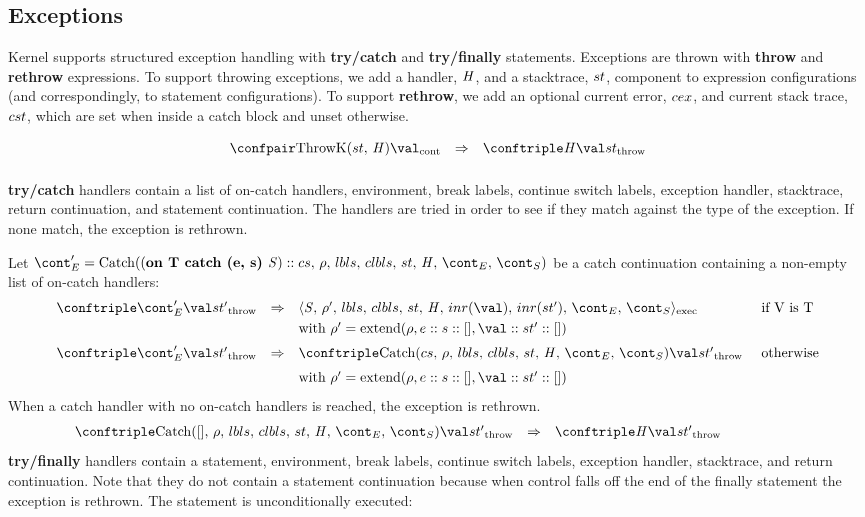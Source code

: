 \documentclass{article}
\DeclareMathOperator{\extend}{extend}
\begin{document}
\subsection{Exceptions}

Kernel supports structured exception handling with \textbf{try/catch} and \textbf{try/finally} statements.
Exceptions are thrown with \textbf{throw} and \textbf{rethrow} expressions.
To support throwing exceptions, we add a handler, $\mathit{H}$, and a stacktrace, $st$, component to expression configurations (and correspondingly, to statement configurations).
To support \textbf{rethrow}, we add an optional current error, $cex$, and current stack trace, $cst$, which are set when inside a catch block and unset otherwise.

\[
  \begin{array}{lcl}
	\contconf{\ThrowH{\strace}{\handler}}{\val}
	& \Rightarrow &
	\throwconf{\handler}{\val}{\strace}\\[2mm]

  \end{array}
\]

\noindent
\textbf{try/catch} handlers contain a list of on-catch handlers, environment, break labels, continue switch labels, exception handler, stacktrace, return continuation, and statement continuation.
The handlers are tried in order to see if they match against the type of the exception.
If none match, the exception is rethrown.

\noindent
Let $\econt' = \CatchH{(\textbf{on T catch (e, s) }\stmt) :: cs}$ be a catch continuation containing a non-empty list of on-catch handlers:
\[
  \begin{array}{lcll}
	\throwconf{\econt'}{\val}{\strace'}
	& \Rightarrow &
	\execconf{\stmt}{\env'}{\lbls}{\clbls}{\handler}{inr(\val)}{inr(\strace')}{\econt}{\scont}
	&\textrm{ if V is T}\\[1mm]

	&&\textrm{with } \env' = \extend(\env, e :: s :: [], \val :: \strace' :: [])\\[2mm]

	\throwconf{\econt'}{\val}{\strace'}
	& \Rightarrow &
	\throwconf{\CatchH{cs}}{\val}{\strace'}	&\textrm{ otherwise}\\[2mm]
	&&\textrm{with } \env' = \extend(\env, e :: s :: [], \val :: \strace' :: [])
  \end{array}
\]
\noindent
When a catch handler with no on-catch handlers is reached, the exception is rethrown.
\[
  \begin{array}{lcll}
	\throwconf{\CatchH{[]}}{\val}{\strace'}
	& \Rightarrow &
	\throwconf{\handler}{\val}{\strace'}\hspace{20mm}
  \end{array}
\]
\noindent
\textbf{try/finally} handlers contain a statement, environment, break labels, continue switch labels, exception handler, stacktrace, and return continuation.
Note that they do not contain a statement continuation because when control falls off the end of the finally statement the exception is rethrown.
The statement is unconditionally executed:
\end{document}
